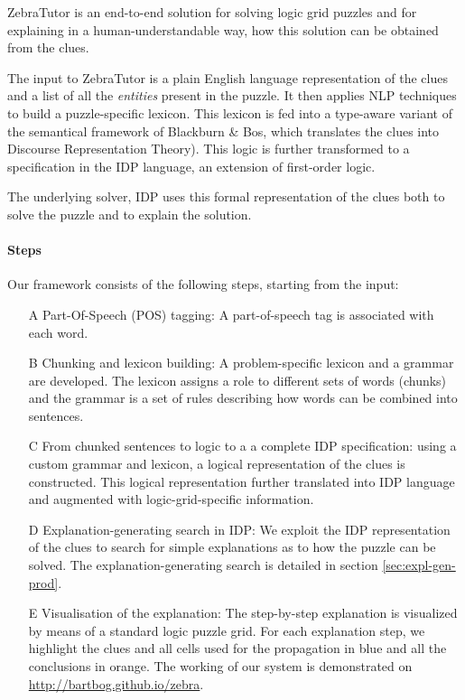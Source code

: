 ZebraTutor is an end-to-end solution for solving logic grid puzzles and for explaining in a human-understandable way, how this solution can be obtained from the clues. 

The input to ZebraTutor is a plain English language representation of the clues and a list of all the \textit{entities} present in the puzzle. It then applies NLP techniques to build a puzzle-specific lexicon. This lexicon is fed into a type-aware variant of the semantical framework of Blackburn \& Bos, which translates the clues into Discourse Representation Theory). This logic is further transformed to a specification in the IDP language, an extension of first-order logic. 

The underlying solver, IDP\cite{pip:de2018predicate} uses this formal representation of the clues both to solve the puzzle and to explain the solution. 

\paragraph{Steps} Our framework consists of the following steps, starting from the input:
\begin{enumerate}
	\item[A] Part-Of-Speech (POS) tagging: A part-of-speech tag is associated with each word.\\
	\item[B] Chunking and lexicon building: A problem-specific lexicon and a grammar are developed. The lexicon assigns a role to different sets of words (chunks) and the grammar is a set of rules describing how words can be combined into sentences.\\
	\item[C] From chunked sentences to logic to a a complete IDP specification: using a custom grammar and lexicon, a logical representation of the clues is constructed. This logical representation further translated into IDP language and augmented with logic-grid-specific information. \\
	\item[D] Explanation-generating search in IDP: We exploit the IDP representation of the clues to search for simple explanations as to how the puzzle can be solved. The explanation-generating search is detailed in section \ref{sec:expl-gen-prod}.\\
	\item[E] Visualisation of the explanation: The step-by-step explanation is visualized by means of a standard logic puzzle grid. For each explanation step, we highlight the clues and all cells used for the propagation in blue and all the conclusions in orange. The working of our system is demonstrated on \url{http://bartbog.github.io/zebra}.
\end{enumerate}

